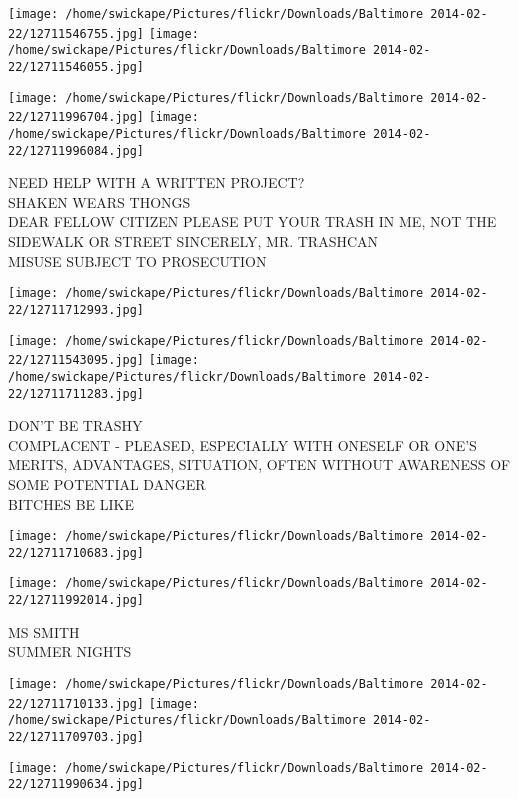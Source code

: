 \documentclass[10pt,letterpaper]{article}
\begin{document}
\texttt{[image: /home/swickape/Pictures/flickr/Downloads/Baltimore 2014-02-22/12711546755.jpg]}
\texttt{[image: /home/swickape/Pictures/flickr/Downloads/Baltimore 2014-02-22/12711546055.jpg]}

\texttt{[image: /home/swickape/Pictures/flickr/Downloads/Baltimore 2014-02-22/12711996704.jpg]}
\texttt{[image: /home/swickape/Pictures/flickr/Downloads/Baltimore 2014-02-22/12711996084.jpg]}

NEED HELP WITH A WRITTEN PROJECT?\\
SHAKEN WEARS THONGS\\
DEAR FELLOW CITIZEN PLEASE PUT YOUR TRASH IN ME, NOT THE SIDEWALK OR STREET SINCERELY, MR. TRASHCAN\\
MISUSE SUBJECT TO PROSECUTION\\
\pagebreak

\texttt{[image: /home/swickape/Pictures/flickr/Downloads/Baltimore 2014-02-22/12711712993.jpg]}

\vspace{0.25in}
\texttt{[image: /home/swickape/Pictures/flickr/Downloads/Baltimore 2014-02-22/12711543095.jpg]}
\texttt{[image: /home/swickape/Pictures/flickr/Downloads/Baltimore 2014-02-22/12711711283.jpg]}

DON'T BE TRASHY\\
COMPLACENT {-} PLEASED, ESPECIALLY WITH ONESELF OR ONE'S MERITS, ADVANTAGES, SITUATION, OFTEN WITHOUT AWARENESS OF SOME POTENTIAL DANGER\\
BITCHES BE LIKE\\
\pagebreak

\texttt{[image: /home/swickape/Pictures/flickr/Downloads/Baltimore 2014-02-22/12711710683.jpg]}

\vspace{0.25in}
\texttt{[image: /home/swickape/Pictures/flickr/Downloads/Baltimore 2014-02-22/12711992014.jpg]}

MS SMITH\\
SUMMER NIGHTS\\
\pagebreak

\texttt{[image: /home/swickape/Pictures/flickr/Downloads/Baltimore 2014-02-22/12711710133.jpg]}
\texttt{[image: /home/swickape/Pictures/flickr/Downloads/Baltimore 2014-02-22/12711709703.jpg]}

\texttt{[image: /home/swickape/Pictures/flickr/Downloads/Baltimore 2014-02-22/12711990634.jpg]}
\end{document}
